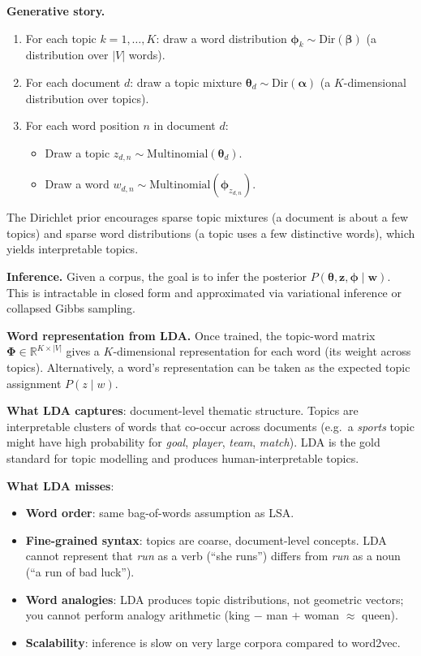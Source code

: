 \documentclass[11pt,a4paper]{article}
\begin{document}
\textbf{Generative story.}
\begin{enumerate}
  \item For each topic $k = 1,\ldots,K$: draw a word distribution $\boldsymbol{\phi}_k \sim \mathrm{Dir}(\boldsymbol{\beta})$ (a distribution over $|V|$ words).
  \item For each document $d$: draw a topic mixture $\boldsymbol{\theta}_d \sim \mathrm{Dir}(\boldsymbol{\alpha})$ (a $K$-dimensional distribution over topics).
  \item For each word position $n$ in document $d$:
    \begin{itemize}
      \item Draw a topic $z_{d,n} \sim \mathrm{Multinomial}(\boldsymbol{\theta}_d)$.
      \item Draw a word $w_{d,n} \sim \mathrm{Multinomial}(\boldsymbol{\phi}_{z_{d,n}})$.
    \end{itemize}
\end{enumerate}

The Dirichlet prior encourages sparse topic mixtures (a document is about a few topics) and sparse word distributions (a topic uses a few distinctive words), which yields interpretable topics.

\textbf{Inference.} Given a corpus, the goal is to infer the posterior $P(\boldsymbol{\theta}, \mathbf{z}, \boldsymbol{\phi} \mid \mathbf{w})$. This is intractable in closed form and approximated via variational inference or collapsed Gibbs sampling.

\textbf{Word representation from LDA.} Once trained, the topic-word matrix $\boldsymbol{\Phi} \in \mathbb{R}^{K \times |V|}$ gives a $K$-dimensional representation for each word (its weight across topics). Alternatively, a word's representation can be taken as the expected topic assignment $P(z \mid w)$.

\begin{insightbox}
\textbf{What LDA captures}: document-level thematic structure.  Topics are interpretable clusters of words that co-occur across documents (e.g.\ a \textit{sports} topic might have high probability for \textit{goal}, \textit{player}, \textit{team}, \textit{match}).  LDA is the gold standard for topic modelling and produces human-interpretable topics.

\textbf{What LDA misses}:
\begin{itemize}
  \item \textbf{Word order}: same bag-of-words assumption as LSA.
  \item \textbf{Fine-grained syntax}: topics are coarse, document-level concepts. LDA cannot represent that \textit{run} as a verb (``she runs'') differs from \textit{run} as a noun (``a run of bad luck'').
  \item \textbf{Word analogies}: LDA produces topic distributions, not geometric vectors; you cannot perform analogy arithmetic (king $-$ man $+$ woman $\approx$ queen).
  \item \textbf{Scalability}: inference is slow on very large corpora compared to word2vec.
\end{itemize}
\end{insightbox}
\end{document}
